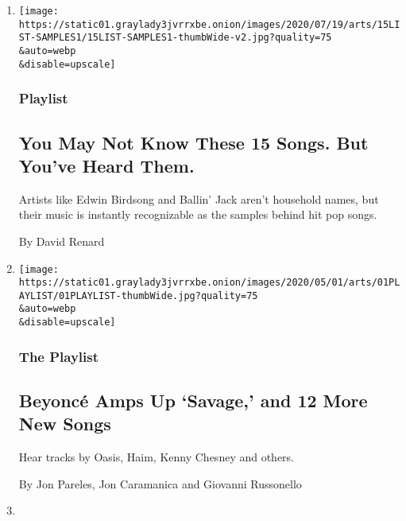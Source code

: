 \begin{enumerate}
\def\labelenumi{\arabic{enumi}.}
\item
  \href{/2020/07/15/arts/music/pop-hip-hop-samples.html}{}

  \texttt{[image: https://static01.graylady3jvrrxbe.onion/images/2020/07/19/arts/15LIST-SAMPLES1/15LIST-SAMPLES1-thumbWide-v2.jpg?quality=75\\\&auto=webp\\\&disable=upscale]}

  \hypertarget{playlist}{%
  \subsubsection{Playlist}\label{playlist}}

  \hypertarget{you-may-not-know-these-15-songs-but-youve-heard-them}{%
  \subsection{You May Not Know These 15 Songs. But You've Heard
  Them.}\label{you-may-not-know-these-15-songs-but-youve-heard-them}}

  Artists like Edwin Birdsong and Ballin' Jack aren't household names,
  but their music is instantly recognizable as the samples behind hit
  pop songs.

  By David Renard
\item
  \href{/2020/05/01/arts/music/playlist-beyonce-megan-thee-stallion-oasis.html}{}

  \texttt{[image: https://static01.graylady3jvrrxbe.onion/images/2020/05/01/arts/01PLAYLIST/01PLAYLIST-thumbWide.jpg?quality=75\\\&auto=webp\\\&disable=upscale]}

  \hypertarget{the-playlist}{%
  \subsubsection{The Playlist}\label{the-playlist}}

  \hypertarget{beyoncuxe9-amps-up-savage-and-12-more-new-songs}{%
  \subsection{Beyoncé Amps Up `Savage,' and 12 More New
  Songs}\label{beyoncuxe9-amps-up-savage-and-12-more-new-songs}}

  Hear tracks by Oasis, Haim, Kenny Chesney and others.

  By Jon Pareles, Jon Caramanica and Giovanni Russonello
\item
  \href{/2020/04/21/arts/television/coronavirus-lockdown-protesters.html}{}


\end{enumerate}
